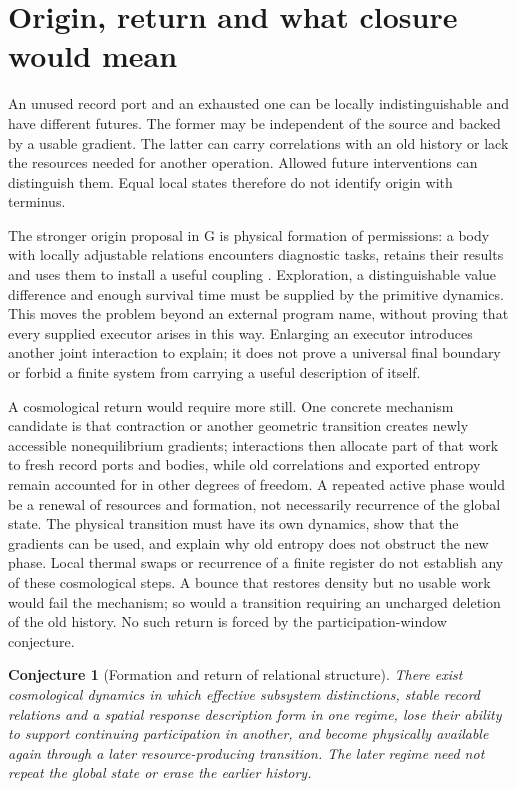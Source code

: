 \documentclass[12pt,a4paper]{article}
\newtheorem{conjecture}{Conjecture}
\begin{document}
\section{Origin, return and what closure would mean}

An unused record port and an exhausted one can be locally indistinguishable and have different futures. The former may be independent of the source and backed by a usable gradient. The latter can carry correlations with an old history or lack the resources needed for another operation. Allowed future interventions can distinguish them. Equal local states therefore do not identify origin with terminus.

The stronger origin proposal in G is physical formation of permissions: a body with locally adjustable relations encounters diagnostic tasks, retains their results and uses them to install a useful coupling \cite{G}. Exploration, a distinguishable value difference and enough survival time must be supplied by the primitive dynamics. This moves the problem beyond an external program name, without proving that every supplied executor arises in this way. Enlarging an executor introduces another joint interaction to explain; it does not prove a universal final boundary or forbid a finite system from carrying a useful description of itself.

A cosmological return would require more still. One concrete mechanism candidate is that contraction or another geometric transition creates newly accessible nonequilibrium gradients; interactions then allocate part of that work to fresh record ports and bodies, while old correlations and exported entropy remain accounted for in other degrees of freedom. A repeated active phase would be a renewal of resources and formation, not necessarily recurrence of the global state. The physical transition must have its own dynamics, show that the gradients can be used, and explain why old entropy does not obstruct the new phase. Local thermal swaps or recurrence of a finite register do not establish any of these cosmological steps. A bounce that restores density but no usable work would fail the mechanism; so would a transition requiring an uncharged deletion of the old history. No such return is forced by the participation-window conjecture.

\begin{conjecture}[Formation and return of relational structure]
There exist cosmological dynamics in which effective subsystem
distinctions, stable record relations and a spatial response description
form in one regime, lose their ability to support continuing participation
in another, and become physically available again through a later
resource-producing transition. The later regime need not repeat the
global state or erase the earlier history.
\end{conjecture}
\end{document}
